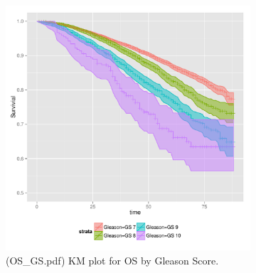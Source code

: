\begin{figure}
  \begin{subfigure}[t]{0.48\textwidth} 
\begin{knitrout}
\color{fgcolor}

{\centering \includegraphics[width=\maxwidth]{figure/OS_GS} 

}



\end{knitrout}

    \caption{(OS\_GS.pdf) KM plot for OS by Gleason Score.}
    \label{fig:OS_GS}
  \end{subfigure}
  ~
  \begin{subfigure}[t]{0.48\textwidth} 
\begin{knitrout}
\color{fgcolor}


\end{knitrout}
\end{subfigure}
\end{figure}
